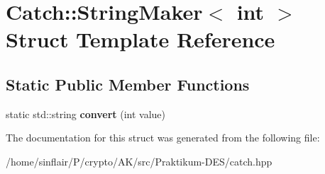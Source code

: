\hypertarget{structCatch_1_1StringMaker_3_01int_01_4}{}\section{Catch\+:\+:String\+Maker$<$ int $>$ Struct Template Reference}
\label{structCatch_1_1StringMaker_3_01int_01_4}
\subsection*{Static Public Member Functions}
\begin{DoxyCompactItemize}
\item 
\mbox{\label{structCatch_1_1StringMaker_3_01int_01_4_aab096e55fb7283f6ad47b5ca277e22e8}} 
static std\+::string {\bfseries convert} (int value)
\end{DoxyCompactItemize}


The documentation for this struct was generated from the following file\+:\begin{DoxyCompactItemize}
\item 
/home/sinflair/\+P/crypto/\+A\+K/src/\+Praktikum-\/\+D\+E\+S/catch.\+hpp\end{DoxyCompactItemize}

